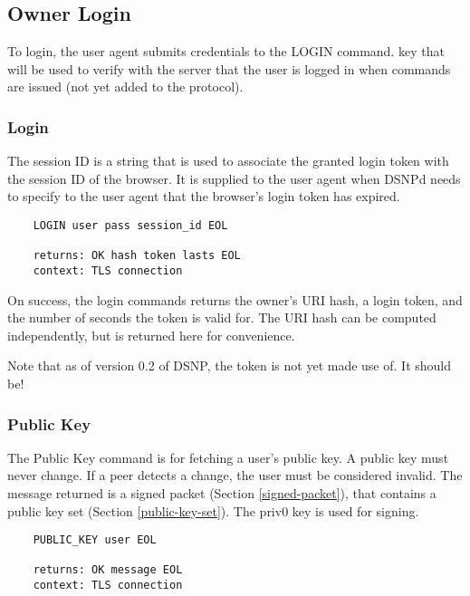 \documentclass[letterpaper,11pt,oneside]{article}
\begin{document}
\subsection{Owner Login}

To login, the user agent submits credentials to the LOGIN command. key that
will be used to verify with the server that the user is logged in when commands
are issued (not yet added to the protocol).

\subsubsection{Login}

The session ID is a string that is used to associate the granted login token
with the session ID of the browser. It is supplied to the user agent when DSNPd
needs to specify to the user agent that the browser's login token has expired.

\vspace{10pt}
\begin{verbatim}
    LOGIN user pass session_id EOL

    returns: OK hash token lasts EOL
    context: TLS connection
\end{verbatim}
\vspace{10pt}

On success, the login commands returns the owner's URI hash, a login token, and
the number of seconds the token is valid for. The URI hash can be computed
independently, but is returned here for convenience.

Note that as of version 0.2 of DSNP, the token is not yet made use of. It
should be!

\subsubsection{Public Key}
\label{public-key-command}

The Public Key command is for fetching a user's public key. A public key must
never change. If a peer detects a change, the user must be considered invalid.
The message returned is a signed packet (Section \ref{signed-packet}), that
contains a public key set (Section \ref{public-key-set}). The priv0 key is used
for signing.

\vspace{10pt}
\begin{verbatim}
    PUBLIC_KEY user EOL

    returns: OK message EOL
    context: TLS connection
\end{verbatim}
\end{document}
